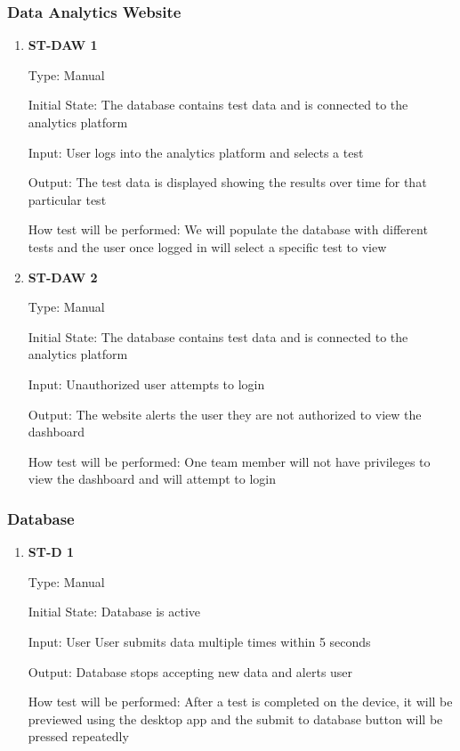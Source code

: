 \documentclass[12pt, titlepage]{article}
\begin{document}
\subsubsection{Data Analytics Website}
\begin{enumerate}
  
  \item{\bf{ST-DAW 1}}
  
  Type: Manual
            
  Initial State: The database contains test data and is connected to the analytics platform
            
  Input: User logs into the analytics platform and selects a test
            
  Output: The test data is displayed showing the results over time for that particular test
  
            
  How test will be performed: We will populate the database with different tests and the user once logged in will select a specific test to view\\

  \item{\bf{ST-DAW 2}}
  
  Type: Manual
            
  Initial State: The database contains test data and is connected to the analytics platform
            
  Input: Unauthorized user attempts to login
            
  Output: The website alerts the user they are not authorized to view the dashboard
  
            
  How test will be performed: One team member will not have privileges to view the dashboard and will attempt to login\\

\end{enumerate}

\subsubsection{Database}

\begin{enumerate}
  
  \item{\bf{ST-D 1}}
  
  Type: Manual
            
  Initial State: Database is active
            
  Input: User User submits data multiple times within 5 seconds
            
  Output: Database stops accepting new data and alerts user
            
  How test will be performed: After a test is completed on the device, it will be previewed using the desktop app and the submit to database button will be pressed repeatedly\\
\end{enumerate}
\end{document}
